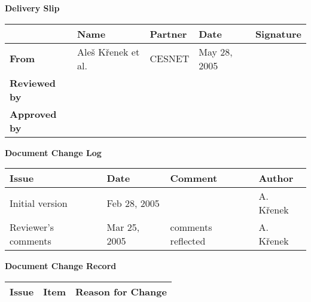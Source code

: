 \begin{center}
{\bf Delivery Slip}
\end{center}
\begin{tabularx}{\textwidth}{|l|l|l|X|X|}
\hline
           & {\bf Name} & {\bf Partner} & {\bf Date} & {\bf Signature} \\
\hline
{\bf From} & Ale\v s K\v{r}enek et al.& CESNET & May 28, 2005 & \\
\hline
{\bf Reviewed by} & & & & \\

\hline
{\bf Approved by} & & & & \\
\hline
\end{tabularx}

\begin{center}
{\bf Document Change Log}
\end{center}

\begin{tabularx}{\textwidth}{|l|l|X|X|}
\hline
{\bf Issue } & {\bf Date  } & {\bf Comment } & {\bf Author  } \\   \hline
Initial version & Feb 28, 2005 & & A. K\v{r}enek \\ \hline
Reviewer's comments & Mar 25, 2005 & comments reflected & A. K\v{r}enek \\
\hline
\end{tabularx}

\begin{center}
{\bf Document Change Record}
\end{center}

\begin{tabularx}{\textwidth}{|l|l|X|}
\hline
{\bf Issue } & {\bf Item  } & {\bf Reason for Change } \\   \hline


\hline
\end{tabularx}


